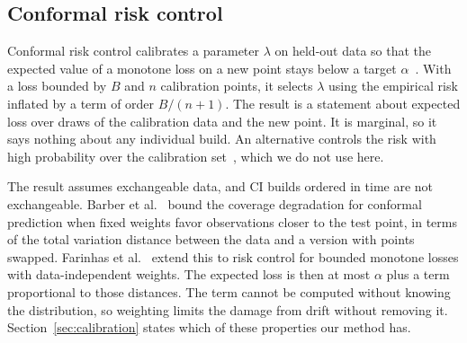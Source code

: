 \subsection{Conformal risk control}
\label{sec:crc}

Conformal risk control calibrates a parameter $\lambda$ on held-out data so that the expected value of a monotone loss on a new point stays below a target $\alpha$~\cite{angelopoulos2024crc}. With a loss bounded by $B$ and $n$ calibration points, it selects $\lambda$ using the empirical risk inflated by a term of order $B/(n+1)$. The result is a statement about expected loss over draws of the calibration data and the new point. It is marginal, so it says nothing about any individual build. An alternative controls the risk with high probability over the calibration set~\cite{bates2021rcps}, which we do not use here.

The result assumes exchangeable data, and CI builds ordered in time are not exchangeable. Barber et al.~\cite{barber2023beyond} bound the coverage degradation for conformal prediction when fixed weights favor observations closer to the test point, in terms of the total variation distance between the data and a version with points swapped. Farinhas et al.~\cite{farinhas2024nonexchangeable} extend this to risk control for bounded monotone losses with data-independent weights. The expected loss is then at most $\alpha$ plus a term proportional to those distances. The term cannot be computed without knowing the distribution, so weighting limits the damage from drift without removing it. Section~\ref{sec:calibration} states which of these properties our method has.

